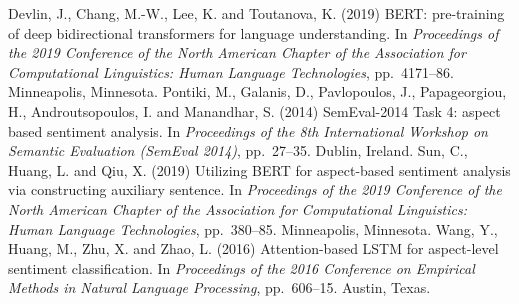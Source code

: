 \documentclass{nle}
\begin{document}
\begin{thebibliography}{}
   Devlin, J., Chang, M.-W., Lee, K. and Toutanova, K. (2019) BERT:
   pre-training of deep bidirectional transformers for language
   understanding. In {\it Proceedings of the 2019 Conference of the
   North American Chapter of the Association for Computational
   Linguistics: Human Language Technologies}, pp.~4171--86.
   Minneapolis, Minnesota.
   Pontiki, M., Galanis, D., Pavlopoulos, J., Papageorgiou, H.,
   Androutsopoulos, I. and Manandhar, S. (2014) SemEval-2014 Task 4:
   aspect based sentiment analysis. In {\it Proceedings of the 8th
   International Workshop on Semantic Evaluation (SemEval 2014)},
   pp.~27--35. Dublin, Ireland.
   Sun, C., Huang, L. and Qiu, X. (2019) Utilizing BERT for
   aspect-based sentiment analysis via constructing auxiliary
   sentence. In {\it Proceedings of the 2019 Conference of the North
   American Chapter of the Association for Computational Linguistics:
   Human Language Technologies}, pp.~380--85. Minneapolis, Minnesota.
   Wang, Y., Huang, M., Zhu, X. and Zhao, L. (2016) Attention-based
   LSTM for aspect-level sentiment classification. In {\it Proceedings
   of the 2016 Conference on Empirical Methods in Natural Language
   Processing}, pp.~606--15. Austin, Texas.
\end{thebibliography}

\label{lastpage}
\end{document}
